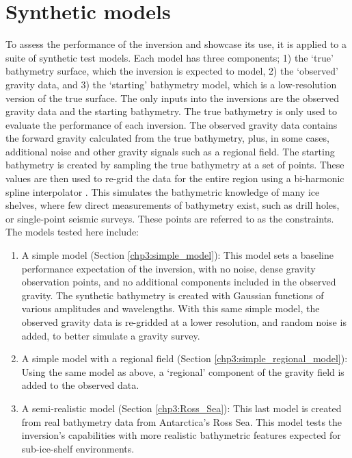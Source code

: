 \section{Synthetic models}
To assess the performance of the inversion and showcase its use, it is applied to a suite of synthetic test models. Each model has three components; 1) the `true' bathymetry surface, which the inversion is expected to model, 2) the `observed' gravity data, and 3) the `starting' bathymetry model, which is a low-resolution version of the true surface. The only inputs into the inversions are the observed gravity data and the starting bathymetry. The true bathymetry is only used to evaluate the performance of each inversion. The observed gravity data contains the forward gravity calculated from the true bathymetry, plus, in some cases, additional noise and other gravity signals such as a regional field. The starting bathymetry is created by sampling the true bathymetry at a set of points. These values are then used to re-grid the data for the entire region using a bi-harmonic spline interpolator \citep{uiedaverde2018}. This simulates the bathymetric knowledge of many ice shelves, where few direct measurements of bathymetry exist, such as drill holes, or single-point seismic surveys. These points are referred to as the constraints. The models tested here include:
\begin{enumerate}
    \item A simple model (Section \ref{chp3:simple_model}): This model sets a baseline performance expectation of the inversion, with no noise, dense gravity observation points, and no additional components included in the observed gravity. The synthetic bathymetry is created with Gaussian functions of various amplitudes and wavelengths. With this same simple model, the observed gravity data is re-gridded at a lower resolution, and random noise is added, to better simulate a gravity survey.
    \item A simple model with a regional field (Section \ref{chp3:simple_regional_model}): Using the same model as above, a `regional' component of the gravity field is added to the observed data.
    \item A semi-realistic model (Section \ref{chp3:Ross_Sea}): This last model is created from real bathymetry data from Antarctica's Ross Sea. This model tests the inversion's capabilities with more realistic bathymetric features expected for sub-ice-shelf environments.
\end{enumerate} 

